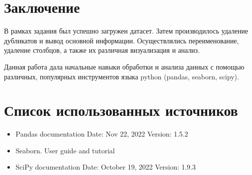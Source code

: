 \documentclass[14pt, a4paper]{article}
\begin{document}
    \section{Заключение}
    
    В рамках задания был успешно загружен датасет. Затем производилось удаление дубликатов и вывод основной информации. Осуществлялись переименование, удаление столбцов, а также их различная визуализация и анализ.

    Данная работа дала начальные навыки обработки и анализа данных с помощью различных, популярных инструментов языка python (pandas, seaborn, scipy).

    \section{Список использованных источников}

    \begin{itemize}
        \item Pandas documentation Date: Nov 22, 2022 Version: 1.5.2
        \item Seaborn. User guide and tutorial
        \item SciPy documentation Date: October 19, 2022 Version: 1.9.3
    \end{itemize}
\end{document}
